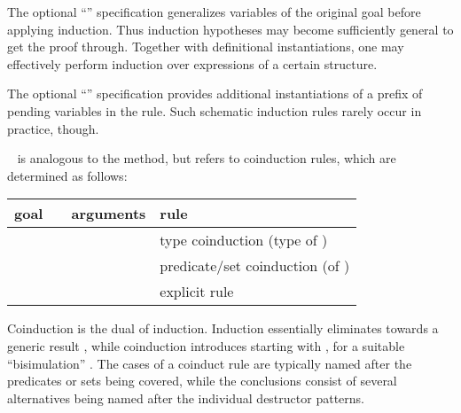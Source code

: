\begin{isabellebody}
\begin{isamarkuptext}
\begin{description}
  The optional ``''
  specification generalizes variables  of the original goal before applying induction.  Thus
  induction hypotheses may become sufficiently general to get the
  proof through.  Together with definitional instantiations, one may
  effectively perform induction over expressions of a certain
  structure.
  
  The optional ``''
  specification provides additional instantiations of a prefix of
  pending variables in the rule.  Such schematic induction rules
  rarely occur in practice, though.

  \item \hyperlink{method.coinduct}{\mbox{}}~ is analogous to the
  \hyperlink{method.induct}{\mbox{}} method, but refers to coinduction rules, which are
  determined as follows:

  \medskip
  \begin{tabular}{llll}
    goal          &                    & arguments & rule \\\hline
                  & \hyperlink{method.coinduct}{\mbox{\isa{coinduct}}} & \isa{x} & type coinduction (type of \isa{x}) \\
    \isa{{\isachardoublequote}A\ x{\isachardoublequote}} & \hyperlink{method.coinduct}{\mbox{\isa{coinduct}}} & \isa{{\isachardoublequote}{\isasymdots}{\isachardoublequote}} & predicate/set coinduction (of \isa{A}) \\
    \isa{{\isachardoublequote}{\isasymdots}{\isachardoublequote}}   & \hyperlink{method.coinduct}{\mbox{\isa{coinduct}}} & \isa{{\isachardoublequote}{\isasymdots}\ rule{\isacharcolon}\ R{\isachardoublequote}} & explicit rule \isa{R} \\
  \end{tabular}
  
  Coinduction is the dual of induction.  Induction essentially
  eliminates  towards a generic result ,
  while coinduction introduces  starting with , for a suitable ``bisimulation'' .  The cases of a
  coinduct rule are typically named after the predicates or sets being
  covered, while the conclusions consist of several alternatives being
  named after the individual destructor patterns.
  

\end{description}
\end{isamarkuptext}
\end{isabellebody}
